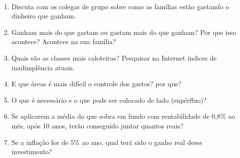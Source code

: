 \begin{task}{}
\begin{table}[H]
\begin{tabu}
\hline
{} \\
\hline
\end{tabu}
\end{table}
\begin{enumerate}
\item Discuta com os colegas de grupo sobre como as famílias estão gastando o dinheiro que ganham.
\item Ganham mais do que gastam ou gastam mais do que ganham? Por que isso acontece? Acontece na sua família?
\item Quais são as classes mais caloteiras? Pesquisar na Internet índices de inadimplência atuais.
\item E que áreas é mais difícil o controle dos gastos? por que?
\item O que é necessário e o que pode ser colocado de lado (supérfluo)?
\item Se aplicarem a média do que sobra em fundo com rentabilidade de 0,8\% ao mês, após 10 anos, terão conseguido juntar quantos reais?
\item Se a inflação for de 5\% ao ano, qual terá sido o ganho real desse investimento?
\end{enumerate}
\end{task}

